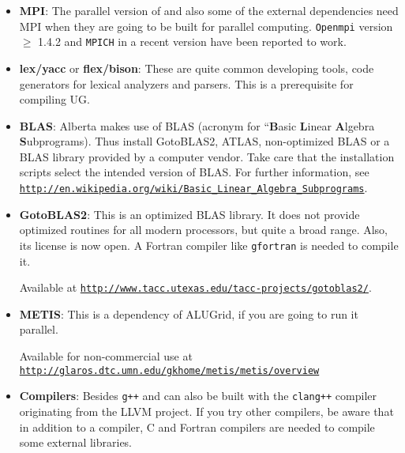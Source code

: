 \begin{itemize}
\item \textbf{MPI}: The parallel version of \Dune and also some of the
  external dependencies need MPI when they are going to be built for
  parallel computing. \texttt{Openmpi} version $\geqslant$ 1.4.2 and
  \texttt{MPICH} in a recent version have been reported to work.

\item \textbf{lex/yacc} or \textbf{flex/bison}: These are quite common
  developing tools, code generators for lexical analyzers and
  parsers. This is a prerequisite for compiling UG.

\item \textbf{BLAS}: Alberta makes use of BLAS (acronym for
  ``\textbf{B}asic \textbf{L}inear \textbf{A}lgebra
  \textbf{S}ubprograms). Thus install GotoBLAS2, ATLAS,
  non-optimized BLAS or a BLAS library provided by a computer
  vendor. Take care that the installation scripts select the intended
  version of BLAS. For further information, see
  \texttt{\url{http://en.wikipedia.org/wiki/Basic_Linear_Algebra_Subprograms}}.

\item \textbf{GotoBLAS2}: This is an optimized BLAS library. It does
  not provide optimized routines for all modern processors, but quite
  a broad range. Also, its license is now open. A Fortran compiler
  like \texttt{gfortran} is needed to compile it.

  Available at
  \texttt{\url{http://www.tacc.utexas.edu/tacc-projects/gotoblas2/}}.

\item \textbf{METIS}: This is a dependency of ALUGrid, if you are
  going to run it parallel.
  
  Available for non-commercial use at
  \texttt{\url{http://glaros.dtc.umn.edu/gkhome/metis/metis/overview}}

\item \textbf{Compilers}: Besides \texttt{g++} \Dune and \eWoms can
  also be built with the \texttt{clang++} compiler originating from
  the LLVM project. If you try other compilers, be aware that in addition to a
  \Cplusplus compiler, C and Fortran compilers are needed to compile
  some external libraries.
\end{itemize}

